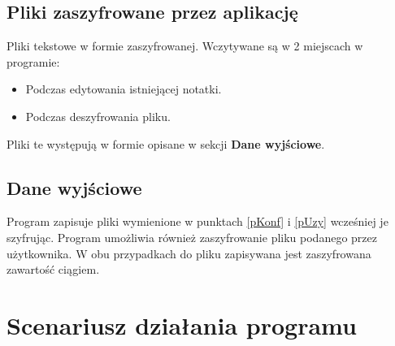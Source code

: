 \documentclass[a4paper]{article}
\begin{document}
\subsection{Pliki zaszyfrowane przez aplikację}
Pliki tekstowe w formie zaszyfrowanej. Wczytywane są w 2 miejscach w programie:
\begin{itemize}
    \item Podczas edytowania istniejącej notatki.
    \item Podczas deszyfrowania pliku.
\end{itemize}
Pliki te występują w formie opisane w sekcji \textbf{Dane wyjściowe}.

\subsection{Dane wyjściowe}
Program zapisuje pliki wymienione w punktach \ref{pKonf} i \ref{pUzy} wcześniej je szyfrując. Program umożliwia również zaszyfrowanie pliku podanego przez użytkownika. W obu przypadkach do pliku zapisywana jest zaszyfrowana zawartość ciągiem.

\newpage

\section{Scenariusz działania programu}
\end{document}
